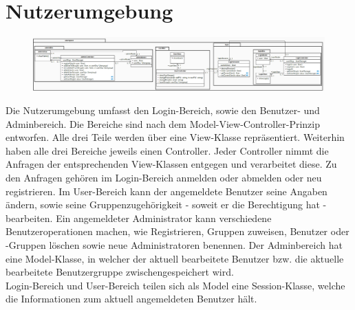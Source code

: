 \section{Nutzerumgebung}

\begin{figure}[h]
\includegraphics[width=1.0\linewidth]{Grafik/Klassendiagramme/Nutzerumgebung.png}
\end{figure}


Die Nutzerumgebung umfasst den Login-Bereich, sowie den Benutzer- und Adminbereich. Die Bereiche sind nach dem Model-View-Controller-Prinzip entworfen. Alle drei Teile werden über eine View-Klasse repräsentiert.
Weiterhin haben alle drei Bereiche jeweils einen Controller. Jeder Controller nimmt die Anfragen der entsprechenden View-Klassen entgegen und 
verarbeitet diese. Zu den Anfragen gehören im Login-Bereich anmelden oder abmelden oder neu registrieren.
Im User-Bereich kann der angemeldete Benutzer seine Angaben  ändern, sowie seine Gruppenzugehörigkeit  - soweit er die Berechtigung hat - bearbeiten.
Ein angemeldeter Administrator kann verschiedene Benutzeroperationen machen, wie Registrieren, Gruppen zuweisen, Benutzer oder -Gruppen löschen sowie  neue Administratoren benennen.
Der Adminbereich hat eine Model-Klasse, in welcher der aktuell bearbeitete Benutzer bzw. die aktuelle bearbeitete Benutzergruppe  zwischengespeichert wird.\\

\noindent Login-Bereich und User-Bereich teilen sich als Model eine Session-Klasse, welche die Informationen zum aktuell angemeldeten Benutzer hält.